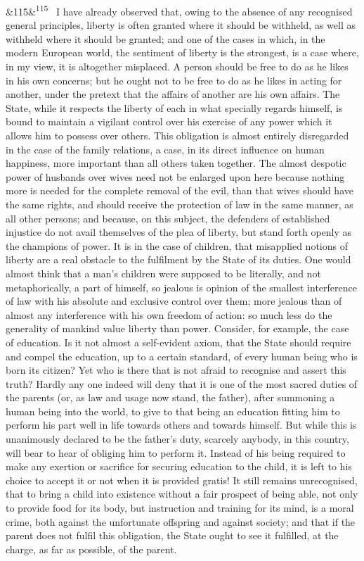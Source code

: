 \documentclass[12pt]{article}
\newcommand{\para}[1][]{\par\noindent\ifx&#1&\else\textsuperscript{\footnotesize #1}~\fi}
\begin{document}
\para[115] I have already observed that, owing to the absence of any recognised general principles, liberty is often granted where it should be withheld, as well as withheld where it should be granted; and one of the cases in which, in the modern European world, the sentiment of liberty is the strongest, is a case where, in my view, it is altogether misplaced. A person should be free to do as he likes in his own concerns; but he ought not to be free to do as he likes in acting for another, under the pretext that the affairs of another are his own affairs. The State, while it respects the liberty of each in what specially regards himself, is bound to maintain a vigilant control over his exercise of any power which it allows him to possess over others. This obligation is almost entirely disregarded in the case of the family relations, a case, in its direct influence on human happiness, more important than all others taken together. The almost despotic power of husbands over wives need not be enlarged upon here because nothing more is needed for the complete removal of the evil, than that wives should have the same rights, and should receive the protection of law in the same manner, as all other persons; and because, on this subject, the defenders of established injustice do not avail themselves of the plea of liberty, but stand forth openly as the champions of power. It is in the case of children, that misapplied notions of liberty are a real obstacle to the fulfilment by the State of its duties. One would almost think that a man's children were supposed to be literally, and not metaphorically, a part of himself, so jealous is opinion of the smallest interference of law with his absolute and exclusive control over them; more jealous than of almost any interference with his own freedom of action: so much less do the generality of mankind value liberty than power. Consider, for example, the case of education. Is it not almost a self-evident axiom, that the State should require and compel the education, up to a certain standard, of every human being who is born its citizen? Yet who is there that is not afraid to recognise and assert this truth? Hardly any one indeed will deny that it is one of the most sacred duties of the parents (or, as law and usage now stand, the father), after summoning a human being into the world, to give to that being an education fitting him to perform his part well in life towards others and towards himself. But while this is unanimously declared to be the father's duty, scarcely anybody, in this country, will bear to hear of obliging him to perform it. Instead of his being required to make any exertion or sacrifice for securing education to the child, it is left to his choice to accept it or not when it is provided gratis! It still remains unrecognised, that to bring a child into existence without a fair prospect of being able, not only to provide food for its body, but instruction and training for its mind, is a moral crime, both against the unfortunate offspring and against society; and that if the parent does not fulfil this obligation, the State ought to see it fulfilled, at the charge, as far as possible, of the parent.
\end{document}
